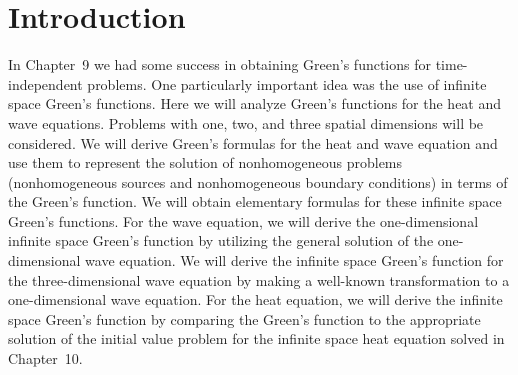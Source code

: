 \section{Introduction}
\label{sec:greens-wave-heat-intro}

In Chapter~9 we had some success in obtaining Green's functions for time-independent problems.  One particularly important idea was the use of infinite space Green's functions.  Here we will analyze Green's functions for the heat and wave equations.  Problems with one, two, and three spatial dimensions will be considered.  We will derive Green's formulas for the heat and wave equation and use them to represent the solution of nonhomogeneous problems (nonhomogeneous sources and nonhomogeneous boundary conditions) in terms of the Green's function.  We will obtain elementary formulas for these infinite space Green's functions.  For the wave equation, we will derive the one-dimensional infinite space Green's function by utilizing the general solution of the one-dimensional wave equation.  We will derive the infinite space Green's function for the three-dimensional wave equation by making a well-known transformation to a one-dimensional wave equation.  For the heat equation, we will derive the infinite space Green's function by comparing the Green's function to the appropriate solution of the initial value problem for the infinite space heat equation solved in Chapter~10.
